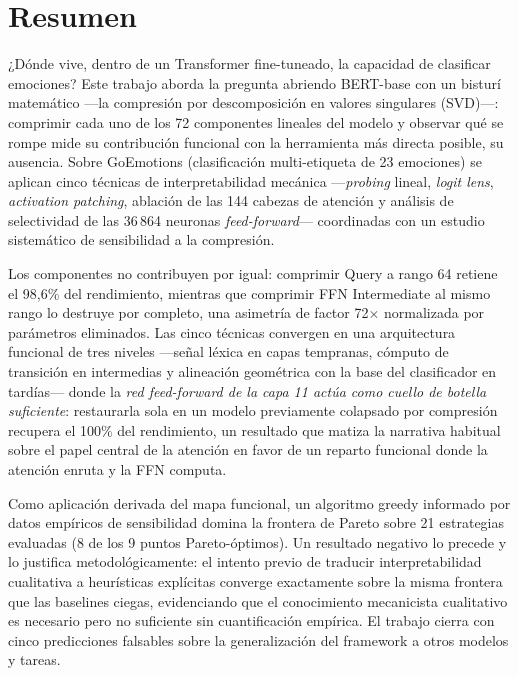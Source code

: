 \documentclass[11pt, a4paper]{article}
\begin{document}
\vspace{1cm}

\section*{Resumen}
\noindent
¿Dónde vive, dentro de un Transformer fine-tuneado, la capacidad de
clasificar emociones? Este trabajo aborda la pregunta abriendo BERT-base
con un bisturí matemático ---la compresión por descomposición en valores
singulares (SVD)---: comprimir cada uno de los 72 componentes lineales del
modelo y observar qué se rompe mide su contribución funcional con la
herramienta más directa posible, su ausencia. Sobre GoEmotions
(clasificación multi-etiqueta de 23 emociones) se aplican cinco técnicas de
interpretabilidad mecánica ---\emph{probing} lineal, \emph{logit lens},
\emph{activation patching}, ablación de las 144 cabezas de atención y
análisis de selectividad de las 36\,864 neuronas \emph{feed-forward}---
coordinadas con un estudio sistemático de sensibilidad a la compresión.

Los componentes no contribuyen por igual: comprimir Query a rango 64
retiene el 98{,}6\% del rendimiento, mientras que comprimir FFN
Intermediate al mismo rango lo destruye por completo, una asimetría de
factor 72$\times$ normalizada por parámetros eliminados. Las cinco
técnicas convergen en una arquitectura funcional de tres niveles ---señal
léxica en capas tempranas, cómputo de transición en intermedias y
alineación geométrica con la base del clasificador en tardías--- donde la
\emph{red feed-forward de la capa 11 actúa como cuello de botella
suficiente}: restaurarla sola en un modelo previamente colapsado por
compresión recupera el 100\% del rendimiento, un resultado que matiza la
narrativa habitual sobre el papel central de la atención en favor de un
reparto funcional donde la atención enruta y la FFN computa.

Como aplicación derivada del mapa funcional, un algoritmo greedy
informado por datos empíricos de sensibilidad domina la frontera de
Pareto sobre 21 estrategias evaluadas (8 de los 9 puntos
Pareto-óptimos). Un resultado negativo lo precede y lo justifica
metodológicamente: el intento previo de traducir interpretabilidad
cualitativa a heurísticas explícitas converge exactamente sobre la misma
frontera que las baselines ciegas, evidenciando que el conocimiento
mecanicista cualitativo es necesario pero no suficiente sin cuantificación
empírica. El trabajo cierra con cinco predicciones falsables sobre la
generalización del framework a otros modelos y tareas.
\end{document}
